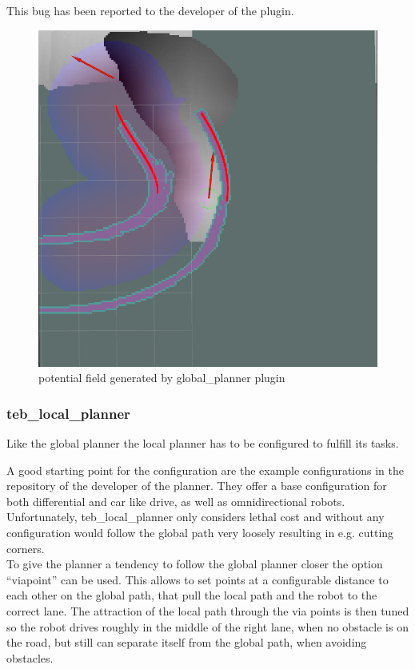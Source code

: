  This bug has been reported to the developer of the plugin. 
 \begin{figure}[H]
 	\centering
 	\includegraphics[width=.7\textwidth]{Pictures/out of bounds}	
 	
 	\caption{potential field generated by global\_planner plugin}
 	\label{potentialfield}
 \end{figure}
 
 \subsubsection{teb\_local\_planner}
Like the global planner the local planner has to be configured to fulfill its tasks.

A good starting point for the configuration are the example configurations in the repository of the developer of the planner\cite{tebtutorials}. They offer a base configuration for both differential and car like drive, as well as omnidirectional robots.\\

Unfortunately, teb\_local\_planner only considers lethal cost and without any configuration would follow the global path very loosely resulting in e.g. cutting corners.\\ 

To give the planner a tendency to follow the global planner closer the option ``viapoint'' can be used. This allows to set points at a configurable distance to each other on the global path, that pull the local path and the robot to the correct lane. The attraction of the local path through the via points is then tuned so the robot drives roughly in the middle of the right lane, when no obstacle is on the road, but still can separate itself from the global path, when avoiding obstacles.\\

